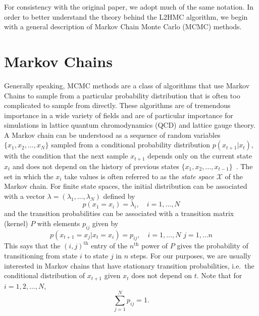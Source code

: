 \documentclass[../main.tex]{subfiles}
\begin{document}
For consistency with the original paper, we adopt much of the same notation.
%
In order to better understand the theory behind the L2HMC algorithm, we begin
with a general description of Markov Chain Monte Carlo (MCMC) methods.
%
\section{Markov Chains}
Generally speaking, MCMC methods are a class of algorithms that use Markov
Chains to sample from a particular probability distribution that is often too
complicated to sample from directly.
%
These algorithms are of tremendous importance in a wide variety of fields and
are of particular importance for simulations in lattice quantum chromodynamics
(QCD) and lattice gauge theory.
%
A Markov chain can be understood as a sequence of random variables ${\{x_1,
x_2, \ldots, x_N\}}$ sampled from a conditional probability distribution
$p{(x_{t+1}|x_t)}$, with the condition that the next sample $x_{t+1}$ depends
only on the current state $x_t$ and does not depend on the history of previous
states ${\{x_1, x_2, \ldots, x_{t-1}\}}$~\cite{brooks2011handbook}.
%
The set in which the $x_i$ take values is often referred to as the \emph{state
space} $\mathcal{X}$ of the Markov chain.
%
For finite state spaces, the initial distribution can be associated with a
vector $\lambda= {(\lambda_1, \ldots, \lambda_N)}$ defined by
%
\begin{equation}
  p(x_1 = x_i) = \lambda_i, \quad i = 1, \ldots, N
\end{equation}
%
and the transition probabilities can be associated with a transition matrix
(kernel) $P$ with elements $p_{ij}$ given by 
\begin{equation}
  p(x_{t+1} = x_j | x_t = x_i) = p_{ij}, \quad i = 1, \ldots, N \,\, j = 1,
\ldots n \end{equation}
This says that the ${(i, j)}^{\mathrm{th}}$ entry of the $n^{\mathrm{th}}$
power of $P$ gives the probability of transitioning from state $i$ to state $j$
in $n$ steps.
%
For our purposes, we are usually interested in Markov chains that have
stationary transition probabilities, i.e.\ the conditional distribution of
$x_{t+1}$ given $x_t$ does not depend on $t$. Note that for $i = 1, 2, \ldots,
N$,
\begin{equation}
  \sum_{j=1}^{N} p_{ij} = 1.
\end{equation}
\end{document}
